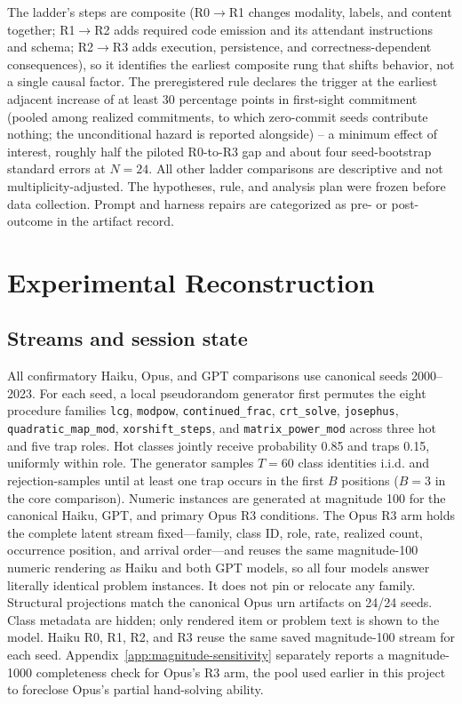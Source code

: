 \documentclass{article}
\begin{document}
The ladder's steps are composite (R0$\to$R1 changes modality, labels, and content together; R1$\to$R2 adds required code emission and its attendant instructions and schema; R2$\to$R3 adds execution, persistence, and correctness-dependent consequences), so it identifies the earliest composite rung that shifts behavior, not a single causal factor. The preregistered rule declares the trigger at the earliest adjacent increase of at least 30 percentage points in first-sight commitment (pooled among realized commitments, to which zero-commit seeds contribute nothing; the unconditional hazard is reported alongside) -- a minimum effect of interest, roughly half the piloted R0-to-R3 gap and about four seed-bootstrap standard errors at $N=24$. All other ladder comparisons are descriptive and not multiplicity-adjusted. The hypotheses, rule, and analysis plan were frozen before data collection. Prompt and harness repairs are categorized as pre- or post-outcome in the artifact record.

\section{Experimental Reconstruction} \label{app:reconstruction}

\subsection{Streams and session state}

All confirmatory Haiku, Opus, and GPT comparisons use canonical seeds 2000--2023. For each seed, a local pseudorandom generator first permutes the eight procedure families \texttt{lcg}, \texttt{modpow}, \texttt{continued\_frac}, \texttt{crt\_solve}, \texttt{josephus}, \texttt{quadratic\_map\_mod}, \texttt{xorshift\_steps}, and \texttt{matrix\_power\_mod} across three hot and five trap roles. Hot classes jointly receive probability 0.85 and traps 0.15, uniformly within role. The generator samples $T=60$ class identities i.i.d. and rejection-samples until at least one trap occurs in the first $B$ positions ($B=3$ in the core comparison). Numeric instances are generated at magnitude 100 for the canonical Haiku, GPT, and primary Opus R3 conditions. The Opus R3 arm holds the complete latent stream fixed---family, class ID, role, rate, realized count, occurrence position, and arrival order---and reuses the same magnitude-100 numeric rendering as Haiku and both GPT models, so all four models answer literally identical problem instances. It does not pin or relocate any family. Structural projections match the canonical Opus urn artifacts on 24/24 seeds. Class metadata are hidden; only rendered item or problem text is shown to the model. Haiku R0, R1, R2, and R3 reuse the same saved magnitude-100 stream for each seed. Appendix~\ref{app:magnitude-sensitivity} separately reports a magnitude-1000 completeness check for Opus's R3 arm, the pool used earlier in this project to foreclose Opus's partial hand-solving ability.
\end{document}
